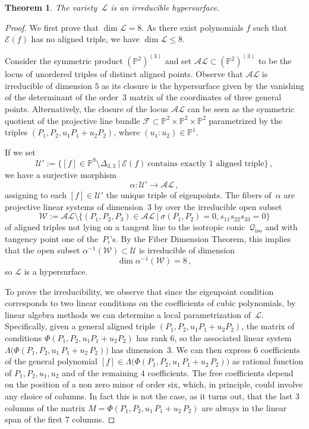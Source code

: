 \documentclass[a4paper, 11pt, reqno]{amsart}
\theoremstyle{plain}
\newtheorem{theorem}[lemma]{Theorem}
\theoremstyle{definition}
\newcommand{\p}{\mathbb{P}}
\newcommand{\sL}{\mathcal{L}}
\newcommand{\sU}{\mathcal{U}}
\newcommand{\sF}{\mathcal{F}}
\newcommand{\iso}{\mathcal{Q}_{\mathrm{iso}}}
\newcommand{\Eig}[1]{\mathcal{E}\!\left( {#1} \right)}
\begin{document}
\begin{theorem}
\label{theorem:irreducible}
The variety~$\sL$ is an irreducible hypersurface.
\end{theorem}

\begin{proof}
We first prove that $\dim \sL = 8$. As there exist
polynomials $f$ such that $\Eig{f}$ has no aligned triple, we have $\dim \sL \le 8$.

Consider the symmetric product $(\p^2)^{(3)}$ and set $\mathcal{AL} \subset (\p^2)^{(3)}$ to be the locus of unordered triples of distinct aligned points. Observe that $\mathcal{AL}$ is irreducible of dimension $5$ as its closure is the hypersurface given by the vanishing of the determinant of the order~$3$ matrix of the coordinates of three general points. Alternatively, the closure of the locus $\mathcal {AL}$ can be seen as the symmetric quotient of the projective line bundle $\sF \subset \p^2 \times \p^2 \times \p^2$ parametrized by the triples $(P_1, P_2, u_1 P_1 +u_2P_2)$, where $(u_1:u_2) \in \p^1$.

If we set
%
\[
  \sU':= \{[f]\in \p^9 \setminus \Delta_{3,3} \ | \ \Eig{f} \ \textrm {contains \ exactly \ $1$ \ aligned \ triple}\} \,,
\]
%
we have a surjective morphism
%
\[
  \alpha \colon \mathcal{U}' \to \mathcal{AL} \,,
\]
%
assigning to each $[f] \in \mathcal{U}'$ the unique triple of eigenpoints.
The fibers of~$\alpha$ are projective linear systems of dimension~$3$ by  over the irreducible open subset
%
\[
  \mathcal{W} := \mathcal{AL}
  \setminus \{(P_1,P_2,P_3) \in \mathcal{AL}
  \ | \ \sigma(P_1,P_2)=0, s_{11} s_{22} s_{33}=0\}
\]
%
of aligned triples not lying
on a tangent line to the isotropic conic~$\iso$ and with tangency point one of the~$P_i$'s. 
By the Fiber Dimension Theorem, this implies that the open subset $\alpha^{-1} (\mathcal{W}) \subset \sU$ is irreducible of dimension
%
\[
  \dim \alpha ^{-1} (\mathcal{W}) = 8 \,,
\]
%
so $\sL$ is a hypersurface.

To prove the irreducibility, we observe that since the eigenpoint condition corresponds to two linear conditions on the coefficients of cubic polynomials, by linear algebra methods we can determine a local parametrization of~$\sL$.
Specifically, given a general aligned triple $(P_1, P_2, u_1 P_1 +u_2P_2)$, the matrix of conditions $\Phi(P_1, P_2, u_1 P_1 +u_2P_2)$ has rank $6$, so the associated linear system
$\Lambda \bigl( \Phi(P_1, P_2, u_1 \, P_1 + u_2 \, P_2) \bigr)$ has dimension~$3$. We can then express $6$ coefficients of the general polynomial
$[f]\in \Lambda \bigl( \Phi(P_1, P_2, u_1 \, P_1 + u_2 \, P_2) \bigr)$ as rational function of $P_1,P_2,u_1,u_2$ and of the remaining $4$ coefficients. The free coefficients depend on the position of a non zero minor of order six, which, in principle, could involve any choice of columns. In fact this is not the case, as it turns out, that the last $3$ columns of the matrix
$M = \Phi(P_1, P_2, u_1 \, P_1 + u_2 \, P_2)$ are always in the linear span of the first $7$ columns.


\end{proof}
\end{document}
